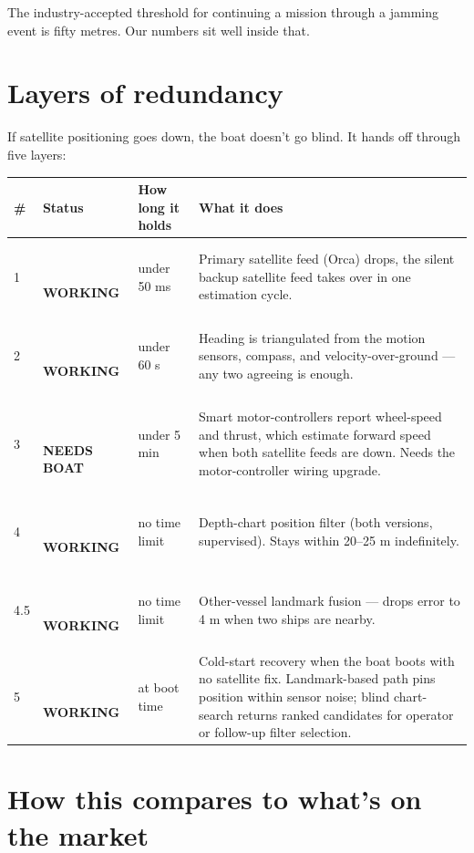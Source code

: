 \documentclass[10pt,a4paper]{article}
\newcommand{\statusbuilt}{{\small\color{white}\colorbox{mSafe}{\,\strut\bfseries\sffamily WORKING\,}}}
\newcommand{\statushardware}{{\small\color{white}\colorbox{mDim}{\,\strut\bfseries\sffamily NEEDS BOAT\,}}}
\begin{document}
The industry-accepted threshold for continuing a mission through a
jamming event is fifty metres. Our numbers sit well inside that.

\pagebreak

\section{Layers of redundancy}

If satellite positioning goes down, the boat doesn't go blind. It
hands off through five layers:

\begin{tabularx}{\textwidth}{@{}l l l X@{}}
\toprule
\textbf{\#} & \textbf{Status} & \textbf{How long it holds} & \textbf{What it does} \\
\midrule
\rowcolor{mRow} 1 & \statusbuilt & under 50 ms & Primary satellite feed (Orca) drops, the silent backup satellite feed takes over in one estimation cycle. \\
2 & \statusbuilt & under 60 s & Heading is triangulated from the motion sensors, compass, and velocity-over-ground --- any two agreeing is enough. \\
\rowcolor{mRow} 3 & \statushardware & under 5 min & Smart motor-controllers report wheel-speed and thrust, which estimate forward speed when both satellite feeds are down. Needs the motor-controller wiring upgrade. \\
4 & \statusbuilt & no time limit & Depth-chart position filter (both versions, supervised). Stays within 20--25 m indefinitely. \\
\rowcolor{mRow} 4.5 & \statusbuilt & no time limit & Other-vessel landmark fusion --- drops error to 4 m when two ships are nearby. \\
5 & \statusbuilt & at boot time & Cold-start recovery when the boat boots with no satellite fix. Landmark-based path pins position within sensor noise; blind chart-search returns ranked candidates for operator or follow-up filter selection. \\
\bottomrule
\end{tabularx}

\section{How this compares to what's on the market}
\end{document}
